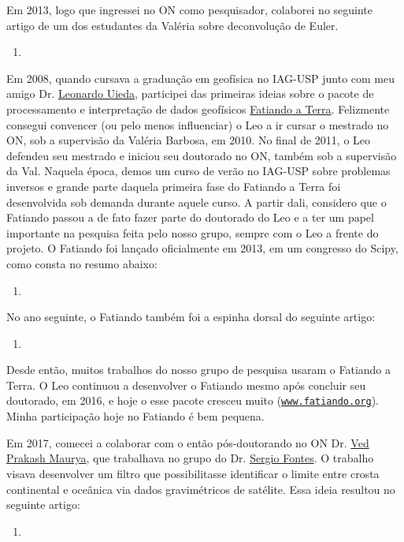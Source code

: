 Em 2013, logo que ingressei no ON como pesquisador, colaborei no seguinte artigo de um dos
estudantes da Valéria sobre deconvolução de Euler.
\begin{enumerate}
	\item {}
\end{enumerate}

\bigskip

\noindent Em 2008, quando cursava a graduação em geofísica no IAG-USP junto com meu amigo
Dr. \href{https://www.leouieda.com/}{Leonardo Uieda}, participei das primeiras ideias 
sobre o pacote de processamento e interpretação de dados geofísicos 
\href{https://www.fatiando.org/about/}{\textsf{Fatiando a Terra}}. 
Felizmente consegui convencer (ou pelo menos influenciar) o Leo a ir cursar o mestrado
no ON, sob a supervisão da Valéria Barbosa, em 2010. 
No final de 2011, o Leo defendeu seu mestrado e iniciou seu doutorado no ON,
também sob a supervisão da Val.
Naquela época, demos um curso de verão no IAG-USP sobre problemas inversos e
grande parte daquela primeira fase do Fatiando a Terra foi desenvolvida sob demanda
durante aquele curso.
A partir dali, considero que o Fatiando passou a de fato fazer parte do doutorado 
do Leo e a ter um papel importante na pesquisa feita pelo nosso grupo, sempre com o Leo
a frente do projeto. O Fatiando foi lançado oficialmente em 2013, em um congresso
do Scipy, como consta no resumo abaixo:
\begin{enumerate}
	\item {}
\end{enumerate}
No ano seguinte, o Fatiando também foi a espinha dorsal do seguinte artigo:
\begin{enumerate}
	\item {}
\end{enumerate}
Desde então, muitos trabalhos do nosso grupo de pesquisa usaram o Fatiando a Terra.
O Leo continuou a desenvolver o Fatiando mesmo após concluir seu doutorado, em 2016,
e hoje o esse pacote cresceu muito 
(\href{https://www.fatiando.org/about/}{\texttt{www.fatiando.org}}).
Minha participação hoje no Fatiando é bem pequena.

\bigskip

\noindent Em 2017, comecei a colaborar com o então pós-doutorando no ON Dr.
\href{https://www.researchgate.net/profile/Ved-Maurya}{Ved Prakash Maurya},
que trabalhava no grupo do Dr. 
\href{https://lattes.cnpq.br/8537150955145617}{Sergio Fontes}.
O trabalho visava desenvolver um filtro que possibilitasse identificar o 
limite entre crosta continental e oceânica via dados gravimétricos de satélite.
Essa ideia resultou no seguinte artigo:
\begin{enumerate}
	\item {}
\end{enumerate}

